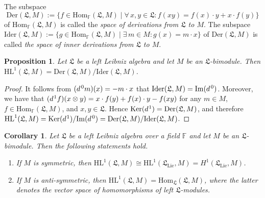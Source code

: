 \documentclass{amsart}
\newtheorem{pro}[thm]{Proposition}
\newtheorem{cor}[thm]{Corollary}
\numberwithin{equation}{section}
\newcommand{\der}{\mathrm{Der}}
\newcommand{\ider}{\mathrm{Ider}}
\newcommand{\lie}{\mathrm{Lie}}
\newcommand{\Ker}{\mathrm{Ker}}
\newcommand{\im}{\mathrm{Im}}
\newcommand{\Hom}{\mathrm{Hom}}
\newcommand{\HL}{\mathrm{HL}}
\newcommand{\F}{\mathbb{F}}
\newcommand{\lf}{\mathfrak{L}}
\begin{document}
The subspace $$\der(\lf,M):=\{f\in\Hom_\F(\lf,M)\mid\forall\,x,y\in\lf:f(xy)=f(x)\cdot y+x
\cdot f(y)\}$$ of $\Hom_\F(\lf,M)$ is called the {\em space of derivations from $\lf$ to $M$\/}.
The subspace $\ider(\lf,M):=\{g\in\Hom_\F(\lf,M)\mid\exists\,m\in M:g(x)=m\cdot x\}$ of
$\der(\lf,M)$ is called {\em the space of inner derivations from $\lf$ to $M$\/}.

\begin{pro}\label{outder}
Let $\lf$ be a left Leibniz algebra and let $M$ be an $\lf$-bimodule. Then $\HL^1(\lf,M)=\der
(\lf,M)/\ider(\lf,M)$.
\end{pro}

\begin{proof}
It follows from $(d\hspace{.4mm}^0m)(x)=-m\cdot x$ that $\ider(\lf,M)=\im(d\hspace{.4mm}^0)$.
Moreover, we have that $(d\hspace{.2mm}^1 f)(x\otimes y)=x\cdot f(y)+f(x)\cdot y-f(xy)$ for
any $m\in M$, $f\in\Hom_\F(\lf,M)$, and $x,y\in\lf$. Hence $\Ker(d\hspace{.2mm}^1)=\der(\lf,M)$,
and therefore $\HL^1(\lf,M)=\Ker(d\hspace{.2mm}^1)/\im(d\hspace{.4mm}^0)=\der(\lf,M)/\ider
(\lf,M)$.
\end{proof}

\begin{cor}\label{asoutder}
Let $\lf$ be a left Leibniz algebra over a field $\F$ and let $M$ be an $\lf$-bimodule. Then the following
statements hold.
\begin{enumerate}
\item[{\rm (a)}] If $M$ is symmetric, then $\HL^1(\lf,M)\cong\HL^1(\lf_\lie,M)=H^1(\lf_\lie,M)$.
\item[{\rm (b)}] If $M$ is anti-symmetric, then $\HL^1(\lf,M)=\Hom_\lf(\lf,M)$, where the latter
                          denotes the vector space of homomorphisms of left $\lf$-modules.
\end{enumerate}
\end{cor}
\end{document}
